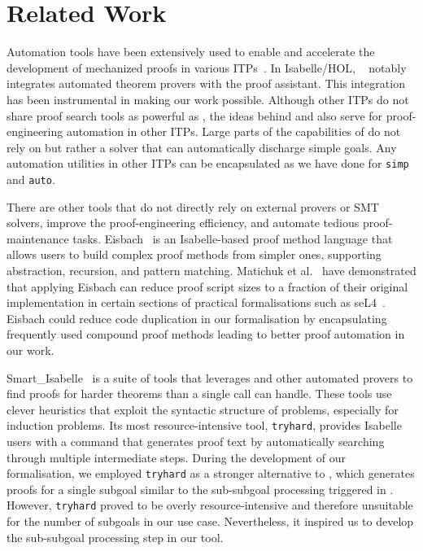 \documentclass[10pt,conference]{IEEEtran}
\newcommand\auto{\texttt{auto}}
\newcommand\simp{\texttt{simp}}
\begin{document}
\section{Related Work}
Automation tools have been extensively used to enable and accelerate the development of mechanized proofs in various ITPs~\cite{leanauto,agdaauto,coqpumpkin,metisreconstruction}. 
In Isabelle/HOL, \sledgehammer{}~\cite{sledgehammersmt,resolution,automationprototype,metisreconstruction,relevancefiltering,highertofirstorder} notably integrates automated theorem provers with the proof assistant. This integration has been instrumental in making our work possible.
Although other ITPs do not share proof search tools as powerful as \sledgehammer{}, the ideas behind \supersketch{} and \superfix{} also serve for proof-engineering automation in other ITPs. Large parts of the capabilities of \supersketch{} do not rely on \sledgehammer{} but rather a solver that can automatically discharge simple goals. Any automation utilities in other ITPs can be encapsulated as we have done for \simp{} and \auto{}.

There are other tools that do not directly rely on external provers or SMT solvers, improve the proof-engineering efficiency, and automate tedious proof-maintenance tasks.
Eisbach~\cite{EisbachITP} is an Isabelle-based proof method language that allows users to build complex proof methods from simpler ones, supporting abstraction, recursion, and pattern matching. Matichuk et al.~\cite{Eisbach} have demonstrated that applying Eisbach can reduce proof script sizes to a fraction of their original implementation in certain sections of practical formalisations such as seL4~\cite{sel4}. Eisbach could reduce code duplication in our formalisation by encapsulating frequently used compound proof methods leading to better proof automation in our work. %




Smart\_Isabelle~\cite{tryhard,selfie,smartinduction,autoinduction} is a suite of tools that leverages \sledgehammer{} and other automated provers to find proofs for harder theorems than a single \sledgehammer{} call can handle. These tools use clever heuristics that exploit the syntactic structure of problems, especially for induction problems. Its most resource-intensive tool, \texttt{tryhard}, provides Isabelle users with a command that generates proof text by automatically searching through multiple intermediate steps. During the development of our formalisation, we employed \texttt{tryhard} as a stronger alternative to \sledgehammer{}, which generates proofs for a single subgoal similar to the sub-subgoal processing triggered in \supersketch{}. However, \texttt{tryhard} proved to be overly resource-intensive and therefore unsuitable for the number of subgoals in our use case. Nevertheless, it inspired us to develop the sub-subgoal processing step in our \supersketch{} tool.
\end{document}
